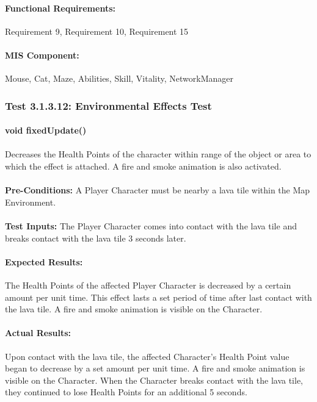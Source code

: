 \documentclass{article}
\begin{document}
    \paragraph{Functional Requirements:} Requirement 9, Requirement 10, Requirement 15
    \paragraph{MIS Component:} Mouse, Cat, Maze, Abilities, Skill, Vitality, NetworkManager
    
    \subsubsection{Test 3.1.3.12: Environmental Effects Test}
    \paragraph{}\textbf{void fixedUpdate()}
    \paragraph{} Decreases the Health Points of the character within range of the object or area to which the effect is attached. A fire and smoke animation is also activated.
    \paragraph{}\textbf{Pre-Conditions:} A Player Character must be nearby a lava tile within the Map Environment.
    \paragraph{}\textbf{Test Inputs:} The Player Character comes into contact with the lava tile and breaks contact with the lava tile 3 seconds later.
    \paragraph{Expected Results:} The Health Points of the affected Player Character is decreased by a certain amount per unit time. This effect lasts a set period of time after last contact with the lava tile. A fire and smoke animation is visible on the Character.
    \paragraph{Actual Results:} Upon contact with the lava tile, the affected Character's Health Point value began to decrease by a set amount per unit time. A fire and smoke animation is visible on the Character. When the Character breaks contact with the lava tile, they continued to lose Health Points for an additional 5 seconds.
\end{document}
